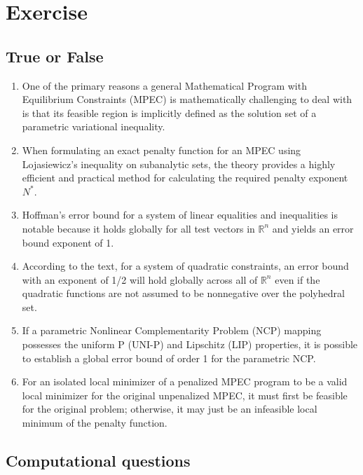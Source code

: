 \documentclass[pdflatex,sn-mathphys-num]{sn-jnl}%
\theoremstyle{definition}
\begin{document}
\section{Exercise}

\subsection{True or False}
\begin{enumerate}[label=(\roman*)]
    \item One of the primary reasons a general Mathematical Program with Equilibrium Constraints (MPEC) is mathematically challenging to deal with is that its feasible region is implicitly defined as the solution set of a parametric variational inequality.

\item When formulating an exact penalty function for an MPEC using Lojasiewicz's inequality on subanalytic sets, the theory provides a highly efficient and practical method for calculating the required penalty exponent $N^*$.

\item Hoffman’s error bound for a system of linear equalities and inequalities is notable because it holds globally for all test vectors in $\mathbb{R}^n$ and yields an error bound exponent of 1.

\item According to the text, for a system of quadratic constraints, an error bound with an exponent of 1/2 will hold globally across all of $\mathbb{R}^n$ even if the quadratic functions are not assumed to be nonnegative over the polyhedral set.

\item If a parametric Nonlinear Complementarity Problem (NCP) mapping possesses the uniform P (UNI-P) and Lipschitz (LIP) properties, it is possible to establish a global error bound of order 1 for the parametric NCP.

\item For an isolated local minimizer of a penalized MPEC program to be a valid local minimizer for the original unpenalized MPEC, it must first be feasible for the original problem; otherwise, it may just be an infeasible local minimum of the penalty function.
\end{enumerate}

\subsection{Computational questions}
\end{document}

